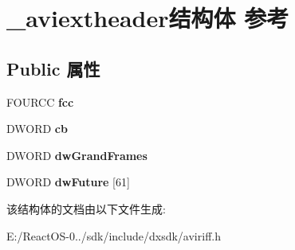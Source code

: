 \hypertarget{struct__aviextheader}{}\section{\+\_\+aviextheader结构体 参考}
\label{struct__aviextheader}
\subsection*{Public 属性}
\begin{DoxyCompactItemize}
\item 
\mbox{\label{struct__aviextheader_aa02ac646864e65a4eec80fce87b51b3a}} 
F\+O\+U\+R\+CC {\bfseries fcc}
\item 
\mbox{\label{struct__aviextheader_ab87b1b0f4eb68d666633df8d2cb0e610}} 
D\+W\+O\+RD {\bfseries cb}
\item 
\mbox{\label{struct__aviextheader_aa38a40a4adfe361fe7e9b69c907cda97}} 
D\+W\+O\+RD {\bfseries dw\+Grand\+Frames}
\item 
\mbox{\label{struct__aviextheader_ab174600531929e2d3334cbbb0a0e1b1c}} 
D\+W\+O\+RD {\bfseries dw\+Future} \mbox{[}61\mbox{]}
\end{DoxyCompactItemize}


该结构体的文档由以下文件生成\+:\begin{DoxyCompactItemize}
\item 
E\+:/\+React\+O\+S-\/0../sdk/include/dxsdk/aviriff.\+h\end{DoxyCompactItemize}
